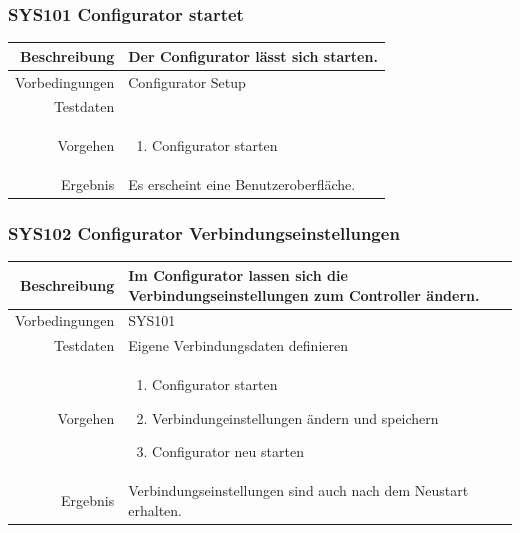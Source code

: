 \subsubsection{SYS101 Configurator startet}
\begin{table}[h!]
	\renewcommand{\arraystretch}{1.5}
	\begin{tabular}{|r|p{14cm}|}
		\hline Beschreibung & Der Configurator lässt sich starten. \\ 
		\hline Vorbedingungen & Configurator Setup \\ 
		\hline Testdaten &  \\ 
		\hline Vorgehen & 
		\begin{enumerate}
			\item Configurator starten
		\end{enumerate} \\ 
		\hline Ergebnis & Es erscheint eine Benutzeroberfläche. \\ 
		\hline 
	\end{tabular}
\end{table}

\subsubsection{SYS102 Configurator Verbindungseinstellungen }
\begin{table}[h!]
	\renewcommand{\arraystretch}{1.5}
	\begin{tabular}{|r|p{14cm}|}
		\hline Beschreibung & Im Configurator lassen sich die Verbindungseinstellungen zum Controller ändern. \\ 
		\hline Vorbedingungen & SYS101 \\ 
		\hline Testdaten & Eigene Verbindungsdaten definieren \\ 
		\hline Vorgehen & 
		\begin{enumerate}
			\item Configurator starten
			\item Verbindungeinstellungen ändern und speichern
			\item Configurator neu starten
		\end{enumerate} \\ 
		\hline Ergebnis & Verbindungseinstellungen sind auch nach dem Neustart erhalten. \\ 
		\hline 
	\end{tabular}
\end{table}

